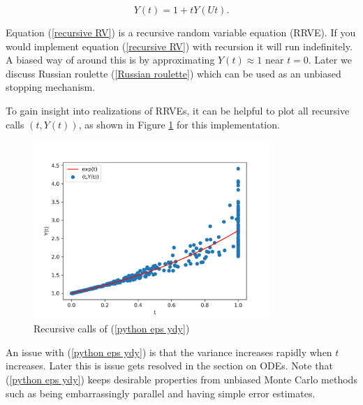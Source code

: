 \documentclass[a4paper,12pt]{article}
\begin{document}
\begin{equation}\label{recursive RV}
    Y(t) = 1 + tY(Ut).
\end{equation}

Equation (\ref{recursive RV}) is a recursive random variable equation (RRVE). If you would implement equation
(\ref{recursive RV}) with recursion it will run indefinitely. A biased way of around this is by approximating
$Y(t) \approx 1$ near $t = 0$. Later we discuss Russian roulette (\ref{Russian roulette}) which
can be used as an unbiased stopping mechanism.

\vspace*{0.2cm}

\begin{pythonn} \label{python eps ydy}
    To gain insight into realizations of RRVEs, it can be helpful to plot
    all recursive calls $(t,Y(t))$, as shown in Figure \ref{fig:intro example}
    for this implementation.

    \begin{figure}[h!]
        \centering
        \includegraphics[width=0.8\textwidth]{plots/intro example.png}
        \caption{Recursive calls of (\ref{python eps ydy})}
        \label{fig:intro example}
    \end{figure}
\end{pythonn}

An issue with (\ref{python eps ydy}) is that the variance increases rapidly when $t$ increases. Later
this is issue gets resolved in the section on ODEs. Note that (\ref{python eps ydy}) keeps desirable properties
from unbiased Monte Carlo methods such as being embarrassingly parallel and
having simple error estimates.
\end{document}
